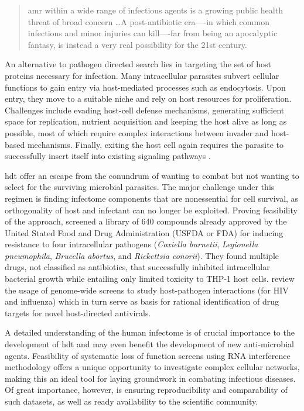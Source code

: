 \begin{quote}
\Gls{amr} within a wide range of infectious agents is a growing public health threat of broad concern \ldots A post-antibiotic era—-in which common infections and minor injuries can kill—-far from being an apocalyptic fantasy, is instead a very real possibility for the 21st century.
\end{quote}

An alternative to pathogen directed search lies in targeting the set of host proteins necessary for infection. Many intracellular parasites subvert cellular functions to gain entry via host-mediated processes such as endocytosis. Upon entry, they move to a suitable niche and rely on host resources for proliferation. Challenges include evading host-cell defense mechanisms, generating sufficient space for replication, nutrient acquisition and keeping the host alive as long as possible, most of which require complex interactions between invader and host-based mechanisms. Finally, exiting the host cell again requires the parasite to successfully insert itself into existing signaling pathways \citep{Leiriao2004}.

\Gls{hdt} offer an escape from the conundrum of wanting to combat but not wanting to select for the surviving microbial parasites. The major challenge under this regimen is finding infectome components that are nonessential for cell survival, as orthogonality of host and infectant can no longer be exploited. Proving feasibility of the approach, \citeauthor{Czyz2014} screened a library of 640 compounds already approved by the United Stated Food and Drug Administration (USFDA or FDA) for inducing resistance to four intracellular pathogens (\textit{Coxiella burnetii}, \textit{Legionella pneumophila}, \textit{Brucella abortus}, and \textit{Rickettsia conorii}). They found multiple drugs, not classified as antibiotics, that successfully inhibited intracellular bacterial growth while entailing only limited toxicity to THP-1 host cells. \citeauthor{Prussia2011} review the usage of genome-wide screens to study host-pathogen interactions (for HIV and influenza) which in turn serve as basis for rational identification of drug targets for novel host-directed antivirals. \nocite{Hawn2015}

A detailed understanding of the human infectome is of crucial importance to the development of \gls{hdt} and may even benefit the development of new anti-microbial agents. Feasibility of systematic loss of function screens using RNA interference methodology offers a unique opportunity to investigate complex cellular networks, making this an ideal tool for laying groundwork in combating infectious diseases. Of great importance, however, is ensuring reproducibility and comparability of such datasets, as well as ready availability to the scientific community.
